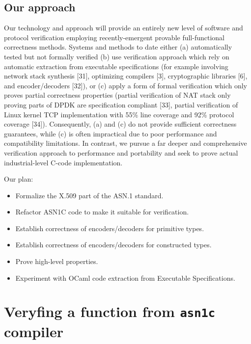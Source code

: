 \documentclass[acmsmall,nonacm]{acmart}
\begin{document}
\subsection{Our approach}
  Our technology and approach will provide an entirely new level of software and protocol verification employing recently-emergent provable full-functional correctness methods.
  Systems and methods to date either (a) automatically tested but not formally verified (b) use verification approach which rely on automatic extraction from executable specifications (for example involving network stack synthesis [31], optimizing compilers [3], cryptographic libraries [6], and encoder/decoders [32]), or (c) apply a form of formal verification which only proves partial correctness properties (partial verification of NAT stack only proving parts of DPDK are specification compliant [33], partial verification of Linux kernel TCP implementation with 55\% line coverage and 92\% protocol coverage [34]). Consequently, (a) and (c) do not provide sufficient correctness guarantees, while (c) is often impractical due to poor performance and compatibility limitations. In contrast, we pursue a far deeper and comprehensive verification approach to performance and portability and seek to prove actual industrial-level C-code implementation.

  Our plan:
  \begin{itemize}

  \item Formalize the X.509 part of the ASN.1 standard.  
   
  \item Refactor ASN1C code to make it suitable for verification.

   \item Establish correctness of encoders/decoders for primitive types.

  \item Establish correctness of encoders/decoders for constructed types.

  \item Prove high-level properties.

   \item Experiment with OCaml code extraction from Executable Specifications.
  \end{itemize}

\section{Veryfing a function from \texttt{asn1c} compiler}
\end{document}
